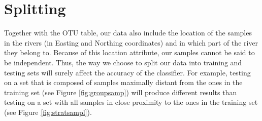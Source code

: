 \section{Splitting}
\label{sec:splitting}

Together with the OTU table, our data also include the location of the samples in the rivers (in Easting and Northing coordinates) and in which part of the river they belong to. Because of this location attribute, our samples cannot be said to be independent. Thus, the way we choose to split our data into training and testing sets will surely affect the accuracy of the classifier. For example, testing on a set that is composed of samples maximally distant from the ones in the training set (see Figure \ref{fig:groupsamp}) will produce different results than testing on a set with all samples in close proximity to the ones in the training set (see Figure \ref{fig:stratsampl}).


